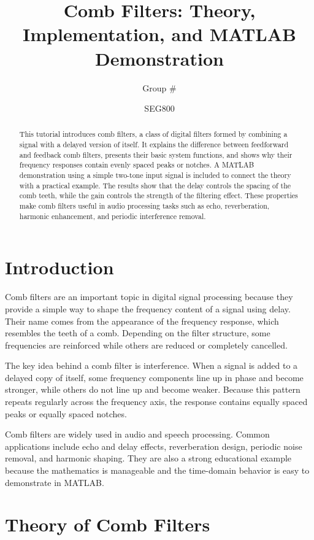 \documentclass[11pt]{article}
\title{Comb Filters: Theory, Implementation, and MATLAB Demonstration}
\author{Group \#\underline{\hspace{2cm}} \\
\underline{\hspace{4cm}} \and \underline{\hspace{4cm}} \and \underline{\hspace{4cm}}}
\date{SEG800}
\begin{document}
\maketitle

\begin{abstract}
This tutorial introduces comb filters, a class of digital filters formed by combining a signal with a delayed version of itself. It explains the difference between feedforward and feedback comb filters, presents their basic system functions, and shows why their frequency responses contain evenly spaced peaks or notches. A MATLAB demonstration using a simple two-tone input signal is included to connect the theory with a practical example. The results show that the delay controls the spacing of the comb teeth, while the gain controls the strength of the filtering effect. These properties make comb filters useful in audio processing tasks such as echo, reverberation, harmonic enhancement, and periodic interference removal.
\end{abstract}

\section{Introduction}
Comb filters are an important topic in digital signal processing because they provide a simple way to shape the frequency content of a signal using delay. Their name comes from the appearance of the frequency response, which resembles the teeth of a comb. Depending on the filter structure, some frequencies are reinforced while others are reduced or completely cancelled.

The key idea behind a comb filter is interference. When a signal is added to a delayed copy of itself, some frequency components line up in phase and become stronger, while others do not line up and become weaker. Because this pattern repeats regularly across the frequency axis, the response contains equally spaced peaks or equally spaced notches.

Comb filters are widely used in audio and speech processing. Common applications include echo and delay effects, reverberation design, periodic noise removal, and harmonic shaping. They are also a strong educational example because the mathematics is manageable and the time-domain behavior is easy to demonstrate in MATLAB.

\section{Theory of Comb Filters}
\end{document}
